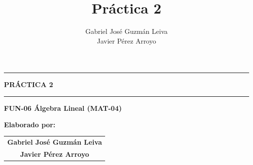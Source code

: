 \documentclass{article}
\title{\huge \textbf{Práctica 2}}
\author{\large Gabriel José Guzmán Leiva \\ \large Javier Pérez Arroyo}
\date{}
\begin{document}
\begin{titlepage}
\centering

\vspace*{0.5cm}

\vspace{1.5cm}

\textcolor{cenfotecblue}{\rule{0.9\textwidth}{3pt}}

\vspace{1cm}

{\Huge \textbf{\textcolor{cenfotecblue}{PRÁCTICA 2}}}

\vspace{0.8cm}

\textcolor{cenfotecgray}{\rule{0.7\textwidth}{1pt}}

\vspace{1.5cm}

\colorbox{cenfotecblue!10}{\parbox{0.8\textwidth}{
\centering
\vspace{0.3cm}
{\Large \textbf{\textcolor{cenfotecblue}{FUN-06 Álgebra Lineal (MAT-04)}}}
\vspace{0.3cm}
}}

\vspace{2cm}

{\large \textbf{\textcolor{cenfotecblue}{Elaborado por:}}}

\vspace{0.8cm}

\begin{tabular}{c}
{\large \textbf{Gabriel José Guzmán Leiva}} \\[0.5cm]
{\large \textbf{Javier Pérez Arroyo}}
\end{tabular}


\end{titlepage}
\end{document}
